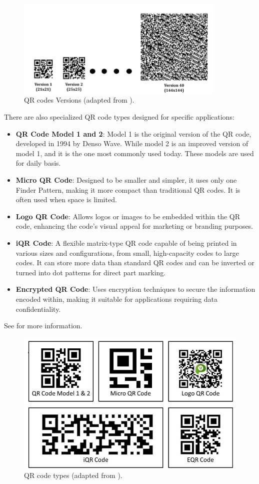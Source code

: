 \begin{figure}[h]
	\centering
	\includegraphics[width=10cm]{assets/ch2/qr_versions}
	\caption{QR codes Versions (adapted from \cite{Tiwari2016}).}
	\label{QR_versions}
\end{figure}


There are also specialized QR code types designed for specific applications:

\begin{itemize}
	\item \textbf{QR Code Model 1 and 2}:
	Model 1 is the original version of the QR code, developed in 1994 by Denso Wave. While model 2 is an improved version of model 1, and it is the one most commonly used today. These models are used for daily basis.
	\item \textbf{Micro QR Code}: Designed to be smaller and simpler, it uses only one Finder Pattern, making it more compact than traditional QR codes. It is often used when space is limited.
	\item \textbf{Logo QR Code}: Allows logos or images to be embedded within the QR code, enhancing the code's visual appeal for marketing or branding purposes.
	\item \textbf{iQR Code}: A flexible matrix-type QR code capable of being printed in various sizes and configurations, from small, high-capacity codes to large codes. It can store more data than standard QR codes and can be inverted or turned into dot patterns for direct part marking.
	\item \textbf{Encrypted QR Code}: Uses encryption techniques to secure the information encoded within, making it suitable for applications requiring data confidentiality.
\end{itemize}

See \cite{Tiwari2016} for more information.

\begin{figure}
	\centering
	\includegraphics[width=0.7\linewidth]{assets/ch2/qr_codes_type}
	\caption{QR code types (adapted from \cite{Tiwari2016}).}
	\label{qr_code_type}
\end{figure}

